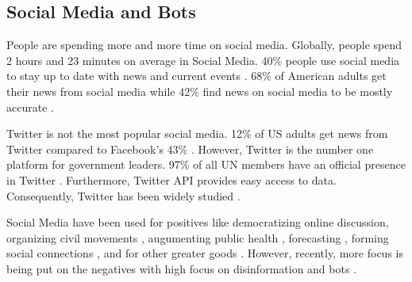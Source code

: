 \documentclass[letterpaper]{article}
\begin{document}
\subsection{Social Media and Bots}
People are spending more and more time on social media. Globally, people spend 2 hours and 23 minutes on average in Social Media. 40\%  people use social media to stay up to date 
with news and current events \cite{2019_social_flagship_report}. 68\% of American adults get their news from
social media while 42\% find news on social media to be mostly accurate \cite{pew_research_news}.\par

Twitter is not the most popular social media. 12\% of US adults get news from Twitter compared to Facebook's 43\% \cite{pew_research_news}. However, 
Twitter is the number one platform for government leaders. 97\% of all UN members have an official presence in Twitter \cite{twiplomacy}. Furthermore, Twitter API provides easy access to data.
Consequently, Twitter has been widely studied \cite{rizoiu2018debatenight,grinberg2019fake,bovet2019influence,morstatter2018alt,munger2017don,gruzd2014investigating,zannettou2019characterizing,howard2016bots}.
\par

Social Media have been used for positives like democratizing online discussion, organizing civil movements \cite{gonzalez2013broadcasters}, augumenting public health 
\cite{dredze2012social}, forecasting \cite{asur2010predicting,nguyen2015sentiment,liu2016predicting}, forming social connections \cite{ellison2007benefits}, and 
for other greater goods \cite{moorhead2013new,househ2014empowering}. However, recently, more focus is being put on the negatives with high focus on disinformation and bots
\cite{forelle2015political,bradshaw2017troops,marwick2017media}. \par
\end{document}
